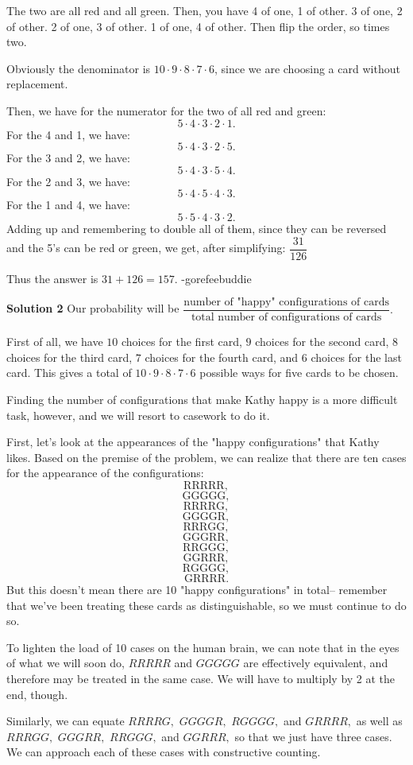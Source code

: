 \documentclass[a4paper,11pt]{article}
\begin{document}
The two are all red and all green. Then, you have 4 of one, 1 of other. 3 of one, 2 of other. 2 of one, 3 of other. 1 of one, 4 of other. Then flip the order, so times two.

Obviously the denominator is $10\cdot 9\cdot 8\cdot 7\cdot 6$, since we are choosing a card without replacement.

Then, we have for the numerator for the two of all red and green: \[5\cdot 4\cdot 3\cdot 2\cdot 1.\]
For the 4 and 1, we have: \[5\cdot 4\cdot 3\cdot 2\cdot 5.\]
For the 3 and 2, we have: \[5\cdot 4\cdot 3\cdot 5\cdot 4.\]
For the 2 and 3, we have: \[5\cdot 4\cdot 5\cdot 4\cdot 3.\]
For the 1 and 4, we have: \[5\cdot 5\cdot 4\cdot 3\cdot 2.\]
Adding up and remembering to double all of them, since they can be reversed and the 5's can be red or green, we get, after simplifying: $\dfrac{31}{126}$

Thus the answer is $31 + 126 = \boxed{157}$. -gorefeebuddie

\textbf{Solution 2}
Our probability will be $\dfrac{\text{number of "happy" configurations of cards}}{\text{total number of configurations of cards}}.$

First of all, we have $10$ choices for the first card, $9$ choices for the second card, $8$ choices for the third card, $7$ choices for the fourth card, and $6$ choices for the last card. This gives a total of $10\cdot 9\cdot 8\cdot 7\cdot 6$ possible ways for five cards to be chosen.

Finding the number of configurations that make Kathy happy is a more difficult task, however, and we will resort to casework to do it.

First, let's look at the appearances of the "happy configurations" that Kathy likes. Based on the premise of the problem, we can realize that there are ten cases for the appearance of the configurations: \[\text{RRRRR},\]\[\text{GGGGG},\]\[\text{RRRRG},\]\[\text{GGGGR},\]\[\text{RRRGG},\]\[\text{GGGRR},\]\[\text{RRGGG},\]\[\text{GGRRR},\]\[\text{RGGGG},\]\[\text{GRRRR}.\] But this doesn't mean there are 10 "happy configurations" in total-- remember that we've been treating these cards as distinguishable, so we must continue to do so.

To lighten the load of 10 cases on the human brain, we can note that in the eyes of what we will soon do, $RRRRR$ and $GGGGG$ are effectively equivalent, and therefore may be treated in the same case. We will have to multiply by 2 at the end, though.

Similarly, we can equate $RRRRG,$ $GGGGR,$ $RGGGG,$ and $GRRRR,$ as well as $RRRGG,$ $GGGRR,$ $RRGGG,$ and $GGRRR,$ so that we just have three cases. We can approach each of these cases with constructive counting.
\end{document}
